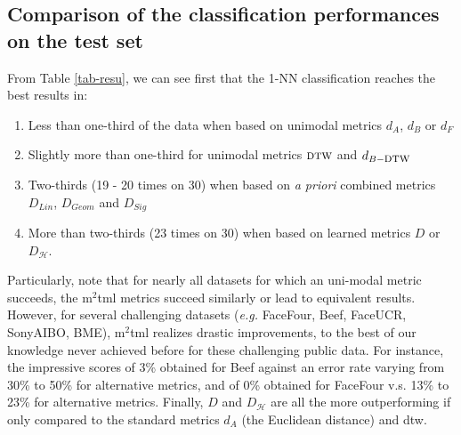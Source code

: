 \newpage
\subsection{Comparison of the classification performances on the test set}
From Table \ref{tab-resu}, we can see first that the 1-NN classification reaches  the best results in: 
\begin{enumerate}
	\item Less than one-third of the data when based on unimodal metrics $d_A$, $d_B$ or $d_F$
	\item Slightly more than one-third for unimodal metrics $\mbox{\sc dtw}$ and $d_{B-\mbox{\sc dtw}}$ 
	\item Two-thirds (19 - 20 times on 30) when based on \textit{a priori} combined metrics $D_{Lin}$, $D_{Geom}$ and $D_{Sig}$
	\item More than two-thirds (23 times on 30)  when based on learned metrics $D$ or  $D_{\mathcal{H}}$.
\end{enumerate}
Particularly, note that for nearly all datasets for which an uni-modal metric succeeds,  the {\sc m}$^2${\sc tml} metrics succeed similarly or lead to equivalent results.  
However, for  several challenging datasets ({\it e.g.} FaceFour, Beef, FaceUCR, SonyAIBO, BME), {\sc m}$^2${\sc tml} realizes drastic improvements, to the best of our knowledge never achieved before  for these challenging public data. For instance, the impressive scores of 3\% obtained for Beef against an  error rate  varying from 30\% to 50\% for alternative metrics,   and of 0\% obtained for FaceFour  v.s. 13\% to 23\% for alternative metrics.  Finally, $D$ and $D_{\mathcal{H}}$ are all the more outperforming if only compared to the standard metrics $d_A$ (the Euclidean distance) and {\sc dtw}. 

